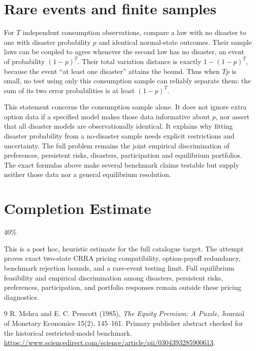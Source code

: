 \documentclass[11pt,a4paper]{article}
\begin{document}
\section{Rare events and finite samples}
For $T$ independent consumption observations, compare a law with no disaster to one with disaster probability $p$ and identical normal-state outcomes. Their sample laws can be coupled to agree whenever the second law has no disaster, an event of probability $(1-p)^T$. Their total variation distance is exactly $1-(1-p)^T$, because the event ``at least one disaster'' attains the bound. Thus when $Tp$ is small, no test using only this consumption sample can reliably separate them: the sum of its two error probabilities is at least $(1-p)^T$.

This statement concerns the consumption sample alone. It does not ignore extra option data if a specified model makes those data informative about $p$, nor assert that all disaster models are observationally identical. It explains why fitting disaster probability from a no-disaster sample needs explicit restrictions and uncertainty. The full problem remains the joint empirical discrimination of preferences, persistent risks, disasters, participation and equilibrium portfolios. The exact formulas above make several benchmark claims testable but supply neither those data nor a general equilibrium resolution.

\section{Completion Estimate}
40\%

This is a post hoc, heuristic estimate for the full catalogue target.
The attempt proves exact two-state CRRA pricing compatibility, option-payoff redundancy, benchmark rejection bounds, and a rare-event testing limit. Full equilibrium feasibility and empirical discrimination among disasters, persistent risks, preferences, participation, and portfolio responses remain outside these pricing diagnostics.

\begin{thebibliography}{9}
 R. Mehra and E. C. Prescott (1985), \emph{The Equity Premium: A Puzzle}, Journal of Monetary Economics 15(2), 145--161. Primary publisher abstract checked for the historical restricted-model benchmark. \url{https://www.sciencedirect.com/science/article/pii/0304393285900613}.
\end{thebibliography}
\end{document}

